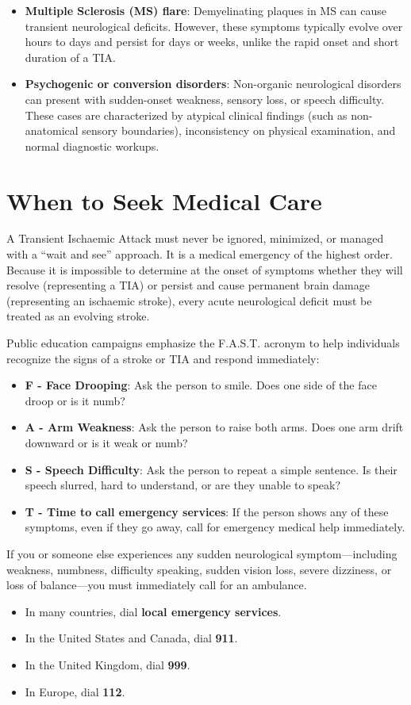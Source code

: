 \begin{itemize}
    \item \textbf{Multiple Sclerosis (MS) flare}: Demyelinating plaques in MS can cause transient neurological deficits. However, these symptoms typically evolve over hours to days and persist for days or weeks, unlike the rapid onset and short duration of a TIA.

    \item \textbf{Psychogenic or conversion disorders}: Non-organic neurological disorders can present with sudden-onset weakness, sensory loss, or speech difficulty. These cases are characterized by atypical clinical findings (such as non-anatomical sensory boundaries), inconsistency on physical examination, and normal diagnostic workups.
\end{itemize}

\section*{When to Seek Medical Care}
A Transient Ischaemic Attack must never be ignored, minimized, or managed with a ``wait and see'' approach. It is a medical emergency of the highest order. Because it is impossible to determine at the onset of symptoms whether they will resolve (representing a TIA) or persist and cause permanent brain damage (representing an ischaemic stroke), every acute neurological deficit must be treated as an evolving stroke.

Public education campaigns emphasize the F.A.S.T. acronym to help individuals recognize the signs of a stroke or TIA and respond immediately:
\begin{itemize}
    \item \textbf{F - Face Drooping}: Ask the person to smile. Does one side of the face droop or is it numb?
    \item \textbf{A - Arm Weakness}: Ask the person to raise both arms. Does one arm drift downward or is it weak or numb?
    \item \textbf{S - Speech Difficulty}: Ask the person to repeat a simple sentence. Is their speech slurred, hard to understand, or are they unable to speak?
    \item \textbf{T - Time to call emergency services}: If the person shows any of these symptoms, even if they go away, call for emergency medical help immediately.
\end{itemize}

If you or someone else experiences any sudden neurological symptom---including weakness, numbness, difficulty speaking, sudden vision loss, severe dizziness, or loss of balance---you must immediately call for an ambulance.
\begin{itemize}
    \item In many countries, dial \textbf{local emergency services}.
    \item In the United States and Canada, dial \textbf{911}.
    \item In the United Kingdom, dial \textbf{999}.
    \item In Europe, dial \textbf{112}.
\end{itemize}

